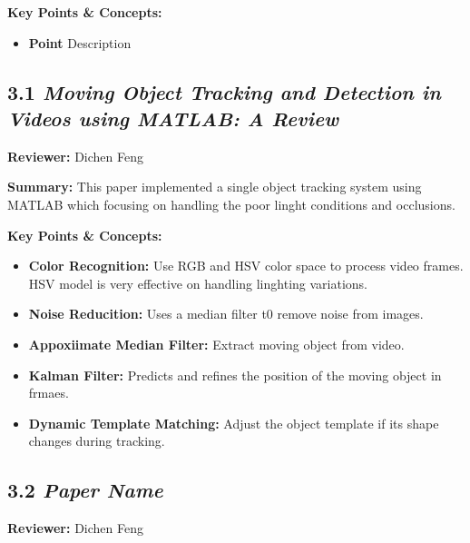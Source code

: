 \documentclass{article}
\begin{document}
\vspace{0.3cm}

\textbf{Key Points \& Concepts:}
\begin{itemize}
  \item \textbf{Point} Description
\end{itemize}

\subsection*{3.1 \textit{Moving Object Tracking and Detection in Videos using MATLAB: A Review}}

\hspace*{\parindent}\textbf{Reviewer:} Dichen Feng

\vspace{0.3cm}

\textbf{Summary:} This paper implemented a single object tracking system using MATLAB which focusing on handling the poor linght conditions and occlusions.

\vspace{0.3cm}

\textbf{Key Points \& Concepts:}
\begin{itemize}
  \item \textbf{Color Recognition:} Use RGB and HSV color space to process video frames. HSV model is very effective on handling linghting variations.
  \item \textbf{Noise Reducition:} Uses a median filter t0 remove noise from images.
  \item \textbf{Appoxiimate Median Filter:} Extract moving object from video.
  \item \textbf{Kalman Filter:} Predicts and refines the position of the moving object in frmaes.
  \item \textbf{Dynamic Template Matching:} Adjust the object template if its shape changes during tracking.
\end{itemize}

\subsection*{3.2 \textit{Paper Name}}

\hspace*{\parindent}\textbf{Reviewer:} Dichen Feng
\end{document}
